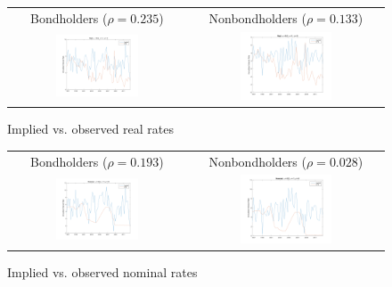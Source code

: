 \begin{figure}[h!]
\ContinuedFloat*
\centering
\begin{tabular}{cc}
Bondholders ($\rho = 0.235$) & Nonbondholders ($\rho = 0.133$) \\
\includegraphics[width=0.49\textwidth]{figs/cex/implied-vs-ffr/bh_real} &
\includegraphics[width=0.49\textwidth]{figs/cex/implied-vs-ffr/nbh_real}
\end{tabular}
\caption{Implied vs. observed real rates}
\label{implied-vs-ffr-cex-real}
\end{figure}

\begin{figure}[h!]
\ContinuedFloat
\centering
\begin{tabular}{cc}
Bondholders ($\rho = 0.193$) & Nonbondholders ($\rho = 0.028$) \\
\includegraphics[width=0.49\textwidth]{figs/cex/implied-vs-ffr/bh_nominal} &
\includegraphics[width=0.49\textwidth]{figs/cex/implied-vs-ffr/nbh_nominal}
\end{tabular}
\caption{Implied vs. observed nominal rates}
\label{implied-vs-ffr-cex-nominal}
\end{figure}

